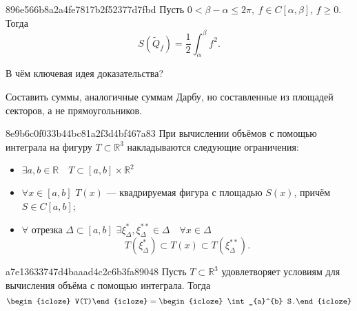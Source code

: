 \begin{note}{896e566b8a2a4fe7817b2f52377d7fbd}
    Пусть \({ 0 < \beta - \alpha \leqslant 2\pi,\: f \in C[\alpha, \beta] }\),\: \({ f \geqslant 0 }\).
    Тогда
    \[
        S(\widetilde Q_f) = \frac{1}{2} \int_{\alpha}^{\beta} f^2.
    \]

    В чём ключевая идея доказательства?

    \begin{cloze}{1}
        Составить суммы, аналогичные суммам Дарбу, но составленные из площадей секторов, а не прямоугольников.
    \end{cloze}
\end{note}

\begin{note}{8e9b6c0f033b44bc81a2f3d4bf467a83}
    При вычислении объёмов с помощью интеграла на фигуру \({ T \subset \mathbb R^3 }\) накладываются следующие ограничения:
    \begin{itemize}
        \item{} \begin{icloze}{1}\({ \exists a, b \in \mathbb R \quad T \subset [a, b] \times \mathbb R^2 }\)\end{icloze}
        \item{} \begin{icloze}{2}\({ \forall x \in [a, b] }\) \quad \({ T(x) }\) --- квадрируемая фигура с площадью \({ S(x) }\), причём \({ S \in C[a, b] }\);\end{icloze}
        \item{}
            \begin{icloze}{3}
                \({ \forall }\) отрезка \({ \Delta \subset [a, b] }\) \quad \({ \exists \xi_\Delta^*, \xi_\Delta^{**} \in \Delta \quad \forall x \in \Delta }\)
                \[
                    T(\xi_\Delta^*) \subset T(x) \subset T(\xi_\Delta^{**}).
                \]
            \end{icloze}
    \end{itemize}
\end{note}

\begin{note}{a7e13633747d4baaad4c2c6b3fa89048}
    Пусть \({ T \subset \mathbb R^3 }\) удовлетворяет условиям для вычисления объёма с помощью интеграла.
    Тогда
    \[
        \begin{icloze}{2}V(T)\end{icloze} = \begin{icloze}{1}\int_{a}^{b} S.\end{icloze}
    \]
\end{note}

